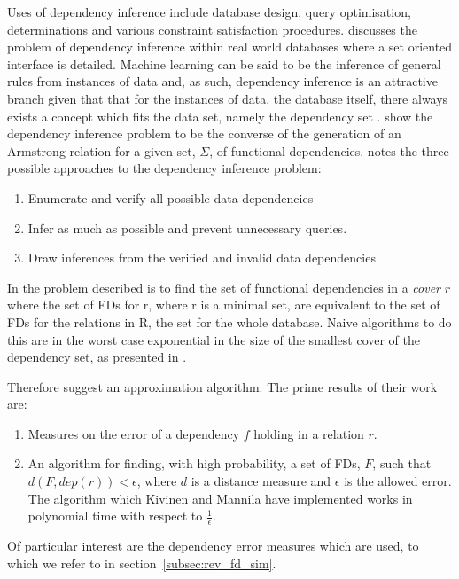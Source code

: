 Uses of dependency inference include database design, query optimisation,
determinations and various constraint satisfaction procedures.  \cite{bb95} discusses the problem of dependency inference within real world databases where a set oriented interface is detailed. Machine learning can be said to be the inference of general rules from instances of data and, as such, dependency inference is an attractive branch given that that for the instances of data, the database itself, there always exists a concept which fits the data set, namely the dependency set \cite{mr94}.
\cite{mr86} show the dependency inference problem to be the converse of
the generation of an Armstrong relation for a given set, $\Sigma$, of
functional dependencies. \cite{bb95} notes the three possible approaches to the dependency
inference problem:
\begin{enumerate}
\item Enumerate and verify all possible data dependencies
\item Infer as much as possible and prevent unnecessary queries.
\item Draw inferences from the verified and invalid data dependencies
\end{enumerate}

In \cite{km95} the problem described is to find the set of functional dependencies in a {\em cover} $r$ where the set of FDs for r, where r is a minimal set, are equivalent to the set of FDs for the relations in R, the set for the whole database.   Naive algorithms to do this are in the worst case exponential in the size of the smallest cover of the dependency set, as presented in \cite{mr94}.

Therefore \cite{km95} suggest an approximation algorithm.  The prime results of
their work are:
\begin{enumerate}
\item Measures on the error of a dependency $f$ holding in a relation $r$.
\item An algorithm for finding, with high probability, a set of FDs, $F$, such
that $d(F, dep(r)) < \epsilon$, where $d$ is a distance measure and $\epsilon$ is the allowed error.  The algorithm which Kivinen and Mannila have implemented
works in polynomial time with respect to $\frac{1}{\epsilon}$.\\
\end{enumerate}

Of particular interest are the dependency error measures which are
used, to which we refer to in section~\ref{subsec:rev_fd_sim}.


